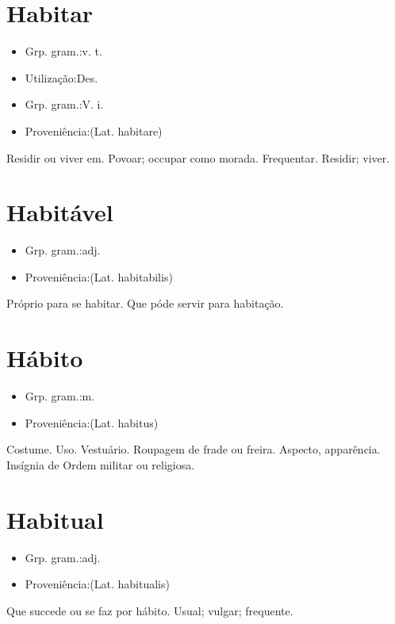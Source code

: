 \documentclass{article}
\begin{document}
\section{Habitar}
\begin{itemize}
\item {Grp. gram.:v. t.}
\end{itemize}
\begin{itemize}
\item {Utilização:Des.}
\end{itemize}
\begin{itemize}
\item {Grp. gram.:V. i.}
\end{itemize}
\begin{itemize}
\item {Proveniência:(Lat. \textunderscore habitare\textunderscore )}
\end{itemize}
Residir ou viver em.
Povoar; occupar como morada.
Frequentar.
Residir; viver.
\section{Habitável}
\begin{itemize}
\item {Grp. gram.:adj.}
\end{itemize}
\begin{itemize}
\item {Proveniência:(Lat. \textunderscore habitabilis\textunderscore )}
\end{itemize}
Próprio para se habitar.
Que póde servir para habitação.
\section{Hábito}
\begin{itemize}
\item {Grp. gram.:m.}
\end{itemize}
\begin{itemize}
\item {Proveniência:(Lat. \textunderscore habitus\textunderscore )}
\end{itemize}
Costume.
Uso.
Vestuário.
Roupagem de frade ou freira.
Aspecto, apparência.
Insígnia de Ordem militar ou religiosa.
\section{Habitual}
\begin{itemize}
\item {Grp. gram.:adj.}
\end{itemize}
\begin{itemize}
\item {Proveniência:(Lat. \textunderscore habitualis\textunderscore )}
\end{itemize}
Que succede ou se faz por hábito.
Usual; vulgar; frequente.
\end{document}
